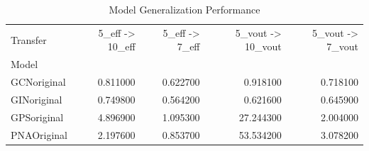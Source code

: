 \begin{table}
\caption{Model Generalization Performance}
\label{tab:gen}
\begin{tabular}{lrrrr}
\toprule
Transfer & 5_eff -> 10_eff & 5_eff -> 7_eff & 5_vout -> 10_vout & 5_vout -> 7_vout \\
Model &  &  &  &  \\
\midrule
GCNoriginal & 0.811000 & 0.622700 & 0.918100 & 0.718100 \\
GINoriginal & 0.749800 & 0.564200 & 0.621600 & 0.645900 \\
GPSoriginal & 4.896900 & 1.095300 & 27.244300 & 2.004000 \\
PNAOriginal & 2.197600 & 0.853700 & 53.534200 & 3.078200 \\
\bottomrule
\end{tabular}
\end{table}
